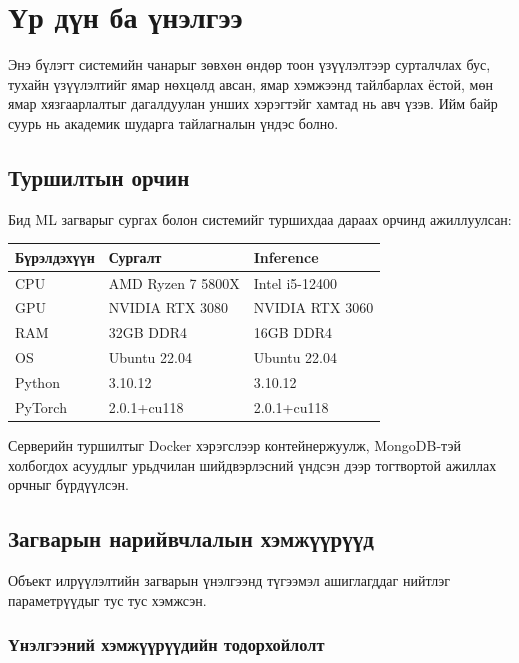 \chapter{Үр дүн ба үнэлгээ}

Энэ бүлэгт системийн чанарыг зөвхөн өндөр тоон үзүүлэлтээр сурталчлах бус, тухайн үзүүлэлтийг ямар нөхцөлд авсан, ямар хэмжээнд тайлбарлах ёстой, мөн ямар хязгаарлалтыг дагалдуулан унших хэрэгтэйг хамтад нь авч үзэв. Ийм байр суурь нь академик шударга тайлагналын үндэс болно.

\section{Туршилтын орчин}

Бид ML загварыг сургах болон системийг туршихдаа дараах орчинд ажиллуулсан:

\begin{table}[H]
\centering
\caption{Туршилтын орчны тохиргоо}
\label{tab:test_env}
\begin{longtable}{|l|l|l|}
\hline
\textbf{Бүрэлдэхүүн} & \textbf{Сургалт} & \textbf{Inference} \\
\hline
CPU & AMD Ryzen 7 5800X & Intel i5-12400 \\
\hline
GPU & NVIDIA RTX 3080 & NVIDIA RTX 3060 \\
\hline
RAM & 32GB DDR4 & 16GB DDR4 \\
\hline
OS & Ubuntu 22.04 & Ubuntu 22.04 \\
\hline
Python & 3.10.12 & 3.10.12 \\
\hline
PyTorch & 2.0.1+cu118 & 2.0.1+cu118 \\
\hline
\end{longtable}
\end{table}

Серверийн туршилтыг Docker хэрэгслээр контейнержуулж, MongoDB-тэй холбогдох асуудлыг урьдчилан шийдвэрлэсний үндсэн дээр тогтвортой ажиллах орчныг бүрдүүлсэн.

\section{Загварын нарийвчлалын хэмжүүрүүд}

Объект илрүүлэлтийн загварын үнэлгээнд түгээмэл ашиглагддаг нийтлэг параметрүүдыг тус тус хэмжсэн.

\subsection{Үнэлгээний хэмжүүрүүдийн тодорхойлолт}


